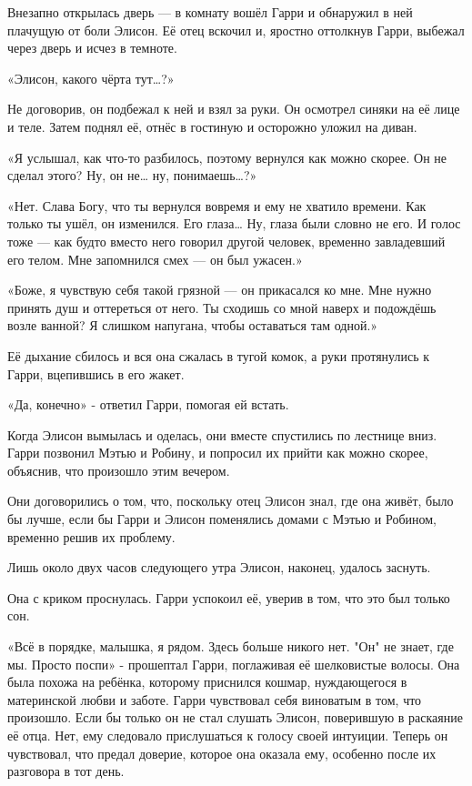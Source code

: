 \documentclass[a5paper, 9pt,
final, openany, twoside=true]{memoir}
\begin{document}
Внезапно открылась дверь — в комнату вошёл Гарри и обнаружил в ней плачущую от боли Элисон. Её отец вскочил и, яростно оттолкнув Гарри, выбежал через дверь и исчез в темноте.

«Элисон, какого чёрта тут…?»

Не договорив, он подбежал к ней и взял за руки. Он осмотрел синяки на её лице и теле. Затем поднял её, отнёс в гостиную и осторожно уложил на диван.

«Я услышал, как что-то разбилось, поэтому вернулся как можно скорее. Он не сделал этого? Ну, он не… ну, понимаешь…?»

«Нет. Слава Богу, что ты вернулся вовремя и ему не хватило времени. Как только ты ушёл, он изменился. Его глаза… Ну, глаза были словно не его. И голос тоже — как будто вместо него говорил другой человек, временно завладевший его телом. Мне запомнился смех — он был ужасен.»

«Боже, я чувствую себя такой грязной — он прикасался ко мне. Мне нужно принять душ и оттереться от него. Ты сходишь со мной наверх и подождёшь возле ванной? Я слишком напугана, чтобы оставаться там одной.»

Её дыхание сбилось и вся она сжалась в тугой комок, а руки протянулись к Гарри, вцепившись в его жакет.

«Да, конечно» - ответил Гарри, помогая ей встать.\bigskip

Когда Элисон вымылась и оделась, они вместе спустились по лестнице вниз. Гарри позвонил Мэтью и Робину, и попросил их прийти как можно скорее, объяснив, что произошло этим вечером.

Они договорились о том, что, поскольку отец Элисон знал, где она живёт, было бы лучше, если бы Гарри и Элисон поменялись домами с Мэтью и Робином, временно решив их проблему.

Лишь около двух часов следующего утра Элисон, наконец, удалось заснуть.\bigskip

Она с криком проснулась. Гарри успокоил её, уверив в том, что это был только сон.

«Всё в порядке, малышка, я рядом. Здесь больше никого нет. "Он" не знает, где мы. Просто поспи» - прошептал Гарри, поглаживая её шелковистые волосы. Она была похожа на ребёнка, которому приснился кошмар, нуждающегося в материнской любви и заботе. Гарри чувствовал себя виноватым в том, что произошло. Если бы только он не стал слушать Элисон, поверившую в раскаяние её отца. Нет, ему следовало прислушаться к голосу своей интуиции. Теперь он чувствовал, что предал доверие, которое она оказала ему, особенно после их разговора в тот день.
\end{document}
